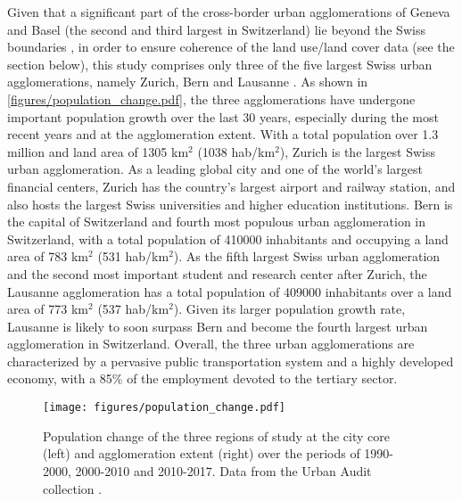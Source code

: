 \documentclass[10pt,letterpaper]{article}
\begin{document}
Given that a significant part of the cross-border urban agglomerations of Geneva and Basel (the second and third largest in Switzerland) lie beyond the Swiss boundaries \cite{sfso2014espace}, in order to ensure coherence of the land use/land cover data (see the section below), this study comprises only three of the five largest Swiss urban agglomerations, namely Zurich, Bern and Lausanne \cite{sfso2018city}.
As shown in \autoref{figures/population_change.pdf}, the three agglomerations have undergone important population growth over the last 30 years, especially during the most recent years and at the agglomeration extent.
With a total population over 1.3 million and land area of 1305 km$^2$ (1038 hab/km$^2$), Zurich is the largest Swiss urban agglomeration. As a leading global city and one of the world's largest financial centers, Zurich has the country's largest airport and railway station, and also hosts the largest Swiss universities and higher education institutions. 
Bern is the capital of Switzerland and fourth most populous urban agglomeration in Switzerland, with a total population of 410000 inhabitants and occupying a land area of 783 km$^2$ (531 hab/km$^2$). As the fifth largest Swiss urban agglomeration and the second most important student and research center after Zurich, the Lausanne agglomeration has a total population of 409000 inhabitants over a land area of 773 km$^2$ (537 hab/km$^2$). Given its larger population growth rate, Lausanne is likely to soon surpass Bern and become the fourth largest urban agglomeration in Switzerland.
Overall, the three urban agglomerations are characterized by a pervasive public transportation system and a highly developed economy, with a 85\% of the employment devoted to the tertiary sector.

\begin{figure}[!ht]
    \centering  
    \texttt{[image: figures/population\_change.pdf]}
    \vspace{.5em}
    \caption[Population change]{\label{figures/population_change.pdf}Population change of the three regions of study at the city core (left) and agglomeration extent (right) over the periods of 1990-2000, 2000-2010 and 2010-2017. Data from the Urban Audit collection \cite{sfso2018city}.}
\end{figure}
\end{document}
